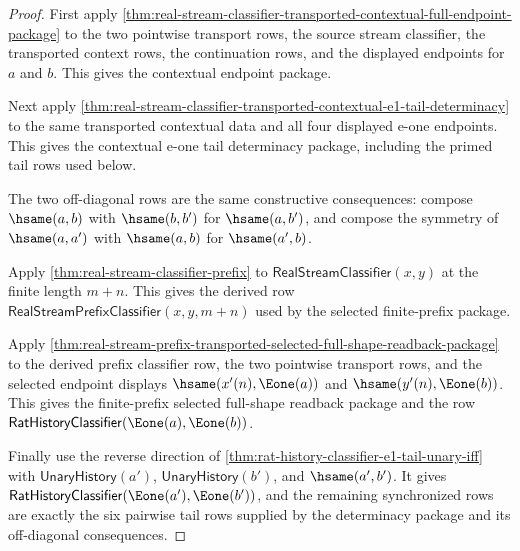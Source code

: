 \begin{proof}
First apply
\autoref{thm:real-stream-classifier-transported-contextual-full-endpoint-package}
to the two pointwise transport rows, the source stream classifier, the
transported context rows, the continuation rows, and the displayed endpoints
for $a$ and $b$. This gives the contextual endpoint package.

Next apply
\autoref{thm:real-stream-classifier-transported-contextual-e1-tail-determinacy}
to the same transported contextual data and all four displayed e-one endpoints.
This gives the contextual e-one tail determinacy package, including the primed
tail rows used below.

The two off-diagonal rows are the same constructive consequences: compose
$\hsame(a,b)$ with $\hsame(b,b')$ for $\hsame(a,b')$, and compose the symmetry
of $\hsame(a,a')$ with $\hsame(a,b)$ for $\hsame(a',b)$.

Apply \autoref{thm:real-stream-classifier-prefix} to
$\mathsf{RealStreamClassifier}(x,y)$ at the finite length $m+n$. This gives the
derived row $\mathsf{RealStreamPrefixClassifier}(x,y,m+n)$ used by the selected
finite-prefix package.

Apply
\autoref{thm:real-stream-prefix-transported-selected-full-shape-readback-package}
to the derived prefix classifier row, the two pointwise transport rows, and the
selected endpoint displays $\hsame(x'(n),\Eone(a))$ and
$\hsame(y'(n),\Eone(b))$. This gives the finite-prefix selected full-shape
readback package and the row
$\mathsf{RatHistoryClassifier}(\Eone(a),\Eone(b))$.

Finally use the reverse direction of
\autoref{thm:rat-history-classifier-e1-tail-unary-iff} with
$\mathsf{UnaryHistory}(a')$, $\mathsf{UnaryHistory}(b')$, and
$\hsame(a',b')$. It gives
$\mathsf{RatHistoryClassifier}(\Eone(a'),\Eone(b'))$, and the remaining
synchronized rows are exactly the six pairwise tail rows supplied by the
determinacy package and its off-diagonal consequences.
\end{proof}

